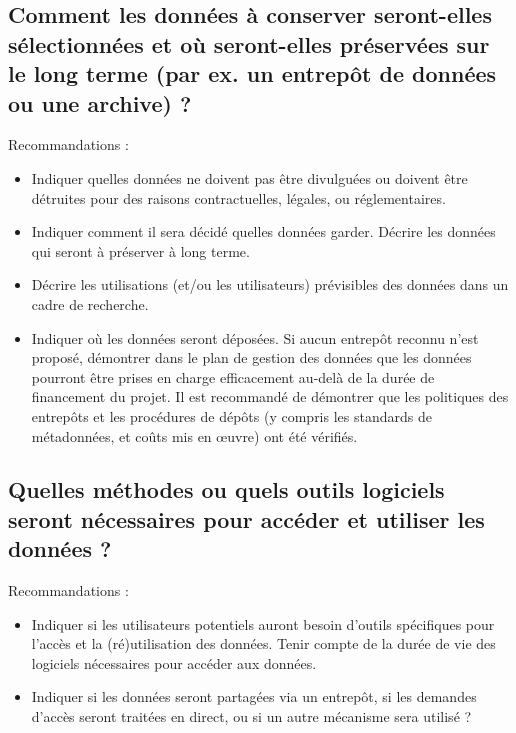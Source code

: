 \documentclass{article}
\begin{document}
\subsection{Comment les données à conserver seront-elles sélectionnées et où seront-elles préservées sur le long terme (par ex. un entrepôt de données ou une archive) ?}
Recommandations :
\begin{itemize}
    \item Indiquer quelles données ne doivent pas être divulguées ou doivent être détruites pour des raisons contractuelles, légales, ou réglementaires.
    \item Indiquer comment il sera décidé quelles données garder. Décrire les données qui seront à préserver à long terme.
    \item Décrire les utilisations (et/ou les utilisateurs) prévisibles des données dans un cadre de recherche.
    \item Indiquer où les données seront déposées. Si aucun entrepôt reconnu n'est proposé, démontrer dans le plan de gestion des données que les données pourront être prises en charge efficacement au-delà de la durée de financement du projet. Il est recommandé de démontrer que les politiques des entrepôts et les procédures de dépôts (y compris les standards de métadonnées, et coûts mis en œuvre) ont été vérifiés.
\end{itemize}

\subsection{Quelles méthodes ou quels outils logiciels seront nécessaires pour accéder et utiliser les données ?}
Recommandations :
\begin{itemize}
    \item Indiquer si les utilisateurs potentiels auront besoin d’outils spécifiques pour l’accès et la (ré)utilisation des données. Tenir compte de la durée de vie des logiciels nécessaires pour accéder aux données.
    \item Indiquer si les données seront partagées via un entrepôt, si les demandes d’accès seront traitées en direct, ou si un autre mécanisme sera utilisé ?
\end{itemize}
\end{document}
